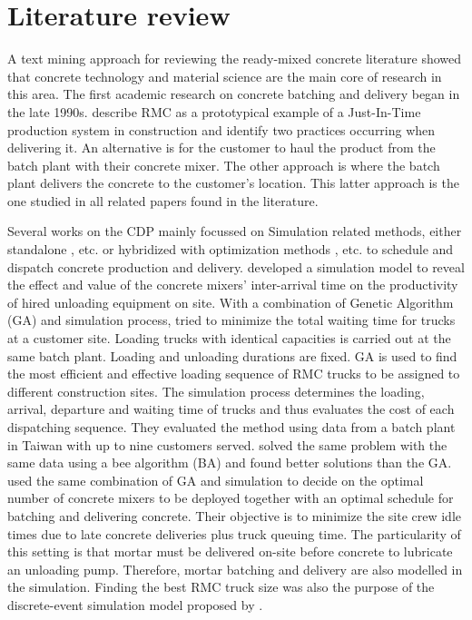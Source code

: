 \documentclass{article}
\begin{document}
{ 
\section{Literature review}
\label{lit_review}

A text mining approach for reviewing the ready-mixed concrete literature \citep{maghrebi2015text} showed that concrete technology and material science are the main core of research in this area. The first academic research on concrete batching and delivery began in the late 1990s. \cite{tommelein1999just} describe RMC as a prototypical example of a Just-In-Time production system in construction and identify two practices occurring when delivering it. An alternative is for the customer to haul the product from the batch plant with their concrete mixer. The other approach is where the batch plant delivers the concrete to the customer's location. This latter approach is the one studied in all related papers found in the literature.  

Several works on the CDP mainly focussed on Simulation related methods, either standalone \citep{zayed2001simulation, wang2001scheduling, tian_simulation_based_2010, panas_simulation_based_2013, galic2016simulation}, etc. or hybridized with optimization methods \citep{feng2004optimizing, lu2005optimized, feng_integrating_2006}, etc. to schedule and dispatch concrete production and delivery. \cite{wang2001scheduling} developed a simulation model to reveal the effect and value of the concrete mixers' inter-arrival time on the productivity of hired unloading equipment on site. With a combination of Genetic Algorithm (GA) and simulation process, \cite{feng2004optimizing} tried to minimize the total waiting time for trucks at a customer site. Loading trucks with identical capacities is carried out at the same batch plant. Loading and unloading durations are fixed. GA is used to find the most efficient and effective loading sequence of RMC trucks to be assigned to different construction sites. The simulation process determines the loading, arrival, departure and waiting time of trucks and thus evaluates the cost of each dispatching sequence. They evaluated the method using data from a batch plant in Taiwan with up to nine customers served. \cite{mayteekrieangkrai2015optimized} solved the same problem with the same data using a bee algorithm (BA) and found better solutions than the GA. \cite{lu2005optimized} used the same combination of GA and simulation to decide on the optimal number of concrete mixers to be deployed together with an optimal schedule for batching and delivering concrete. Their objective is to minimize the site crew idle times due to late concrete deliveries plus truck queuing time. The particularity of this setting is that mortar must be delivered on-site before concrete to lubricate an unloading pump. Therefore, mortar batching and delivery are also modelled in the simulation. Finding the best RMC truck size was also the purpose of the discrete-event simulation model proposed by \cite{panas_simulation_based_2013}. 

}
\end{document}
